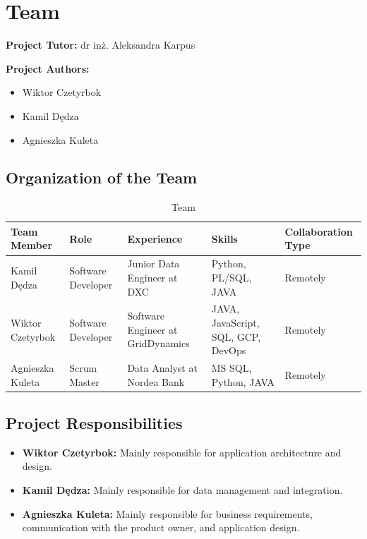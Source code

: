 \section{Team}

\noindent \textbf{Project Tutor:} dr inż. Aleksandra Karpus

\noindent \textbf{Project Authors:}
\begin{itemize}
   \item Wiktor Czetyrbok
   \item Kamil Dędza
   \item Agnieszka Kuleta
\end{itemize}

\subsection{Organization of the Team}

\begin{table}[h!]
\centering
\begin{tabular}{| m{2cm} | m{2cm} | m{4cm} | m{3cm} | m{2cm} |}
    \hline
    \textbf{Team Member} & \textbf{Role} & \textbf{Experience} & \textbf{Skills} & \textbf{Collaboration Type} \\
    \hline
    Kamil Dędza & Software Developer & Junior Data Engineer at DXC & Python, PL/SQL, JAVA & Remotely \\
    \hline
    Wiktor Czetyrbok & Software Developer & Software Engineer at GridDynamics & JAVA, JavaScript, SQL, GCP, DevOps & Remotely \\
    \hline
    Agnieszka Kuleta & Scrum Master & Data Analyst at Nordea Bank & MS SQL, Python, JAVA & Remotely \\
    \hline
\end{tabular}
\caption{Team}
\end{table}

\subsection{Project Responsibilities}
\begin{itemize}
   \item \textbf{Wiktor Czetyrbok:} Mainly responsible for application architecture and design.
   \item \textbf{Kamil Dędza:} Mainly responsible for data management and integration.
   \item \textbf{Agnieszka Kuleta:} Mainly responsible for business requirements, communication with the product owner, and application design.
\end{itemize}

